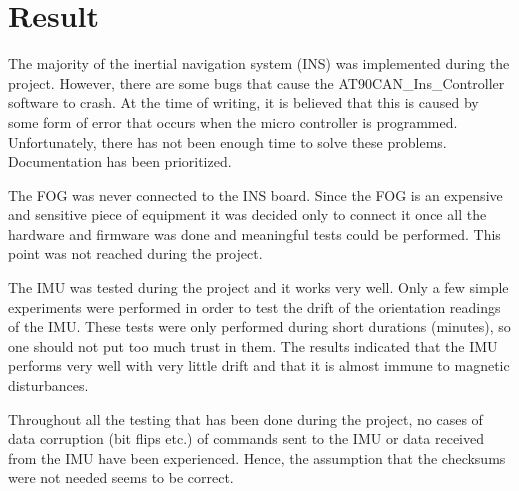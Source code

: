 
\section{Result}\label{sec:result}
The majority of the inertial navigation system (INS) was implemented during the project. However, there are some bugs that cause the AT90CAN\_Ins\_Controller software to crash. At the time of writing, it is believed that this is caused by some form of error that occurs when the micro controller is programmed. Unfortunately, there has not been enough time to solve these problems. Documentation has been prioritized.

The FOG was never connected to the INS board. Since the FOG is an expensive and sensitive piece of equipment it was decided only to connect it once all the hardware and firmware was done and meaningful tests could be performed. This point was not reached during the project.

The IMU was tested during the project and it works very well. Only a few simple experiments were performed in order to test the drift of the orientation readings of the IMU. These tests were only performed during short durations (minutes), so one should not put too much trust in them. The results indicated that the IMU performs very well with very little drift and that it is almost immune to magnetic disturbances.

Throughout all the testing that has been done during the project, no cases of data corruption (bit flips etc.) of commands sent to the IMU or data received from the IMU have been experienced. Hence, the assumption that the checksums were not needed seems to be correct.
